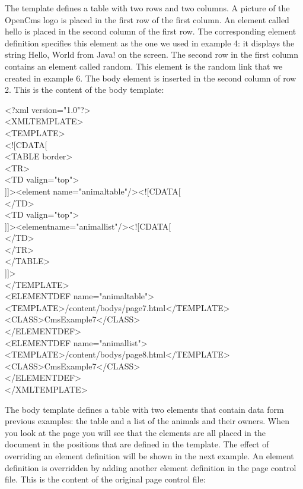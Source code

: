 The template defines a table with two rows and two columns. A picture
of the  OpenCms logo is placed in the first row of the first column. An
element called {\name hello} is placed in the second column of the first row.
The corresponding element definition specifies this element as the one
we used in example 4: it displays the string {\name Hello, World from Java!}
on the screen.
The second row in the first column contains an element called {\name random.}
This element is the random link that we created in example 6. The body
element is inserted in the second column of row 2. This is the content
of the body template:

\begin{xml}
<?xml version="1.0"?>\\
<XMLTEMPLATE>\\
<TEMPLATE>\\
<![CDATA[\\
<TABLE border>\\
\xtaba        <TR>\\
<TD valign="top">\\
]]><element name="animaltable"/><![CDATA[\\
</TD>\\
\xtabb                <TD valign="top">\\
]]><elementname="animallist"/><![CDATA[\\
</TD>\\
\xtaba        </TR>\\
</TABLE>\\
]]>\\
</TEMPLATE>\\

<ELEMENTDEF name="animaltable">\\
<TEMPLATE>/content/bodys/page7.html</TEMPLATE>\\
<CLASS>CmsExample7</CLASS>\\
</ELEMENTDEF>\\

<ELEMENTDEF name="animallist">\\
<TEMPLATE>/content/bodys/page8.html</TEMPLATE>\\
<CLASS>CmsExample7</CLASS>\\
</ELEMENTDEF>\\

</XMLTEMPLATE>\\
\end{xml}

The body template defines a table with two elements that contain data
form previous examples: the table and a list of the animals and their
owners. When you look at the page you will see that the elements are
all placed in the document in the positions that are defined in the
template.
The effect of overriding an element definition will be shown in the
next example. An element definition is overridden by adding another
element definition in the page control file. This is the content of
the original page control file:

